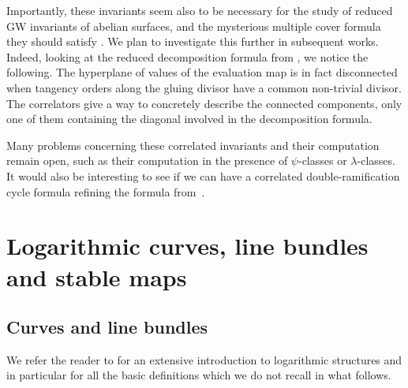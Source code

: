 \documentclass[pdftex]{sigma}
\numberwithin{equation}{section}
\theoremstyle{definition}
\begin{document}
Importantly, these invariants seem also to be necessary for the study of reduced GW invariants of abelian surfaces, and the mysterious multiple cover formula they should satisfy \cite{blomme2022abelian3,oberdieck2022gromov}. We plan to investigate this further in subsequent works. Indeed, looking at the reduced decomposition formula from \cite[Section 4.6]{maulik2010curves}, we notice the following. The hyperplane of values of the evaluation map is in fact disconnected when tangency orders along the gluing divisor have a common non-trivial divisor. The correlators give a way to concretely describe the connected components, only one of them containing the diagonal involved in the decomposition formula.

Many problems concerning these correlated invariants and their computation remain open, such as their computation in the presence of $\psi$-classes or $\lambda$-classes. It would also be interesting to see if we can have a correlated double-ramification cycle formula refining the formula from~\cite{janda2020double}.




\section{Logarithmic curves, line bundles and stable maps}
\subsection{Curves and line bundles}
We
refer the reader to \cite{ogus} for an extensive introduction to logarithmic structures and in particular for all the basic definitions which we do not recall in what follows.
\end{document}
